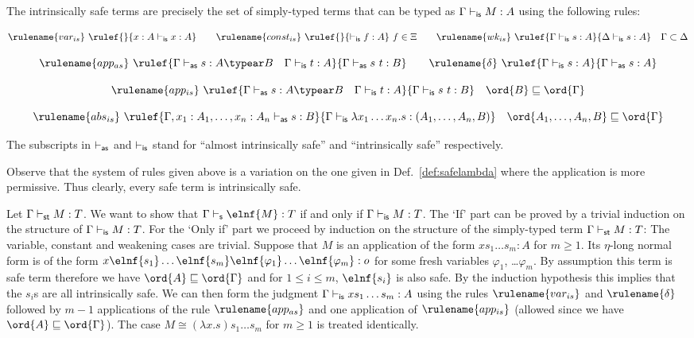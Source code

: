 \begin{lemma}
  \label{lem:intrinsic_safe}
  The intrinsically safe terms are precisely the set of simply-typed terms that can be typed
  as $\Gamma \vdash_{\sf is} M : A$ using the following rules:

$$ \rulename{var_{is}} \ \rulef{}{x : A\isentail x : A} \qquad
\rulename{const_{is}} \ \rulef{}{\isentail f : A}~f \in \Xi \qquad
\rulename{wk_{is}} \ \rulef{\Gamma \isentail s : A}{\Delta \isentail s : A} \quad
\Gamma \subset \Delta$$

$$ \rulename{app_{as}} \ \rulef{\Gamma \asentail s : A\typear B
\quad \Gamma \isentail t : A} {\Gamma \asentail s~t : B}
\qquad
\rulename{\delta} \ \rulef{\Gamma \isentail s : A}{\Gamma \asentail s : A}
$$

$$ \rulename{app_{is}} \ \rulef{\Gamma \asentail s : A\typear B
\quad \Gamma \isentail t : A} {\Gamma \isentail s~t : B} \quad \ord{B} \sqsubseteq
\ord{\Gamma}$$

$$ \rulename{abs_{is}} \ \rulef{\Gamma, x_1 : A_1, \ldots, x_n : A_n
  \asentail s : B} {\Gamma \isentail \lambda x_1 \ldots x_n . s :
  (A_1, \ldots ,A_n,B)} \quad \ord{A_1, \ldots ,A_n,B} \sqsubseteq
\ord{\Gamma}$$
\smallskip

The subscripts in $\vdash_{\sf as}$ and $\vdash_{\sf is}$ stand for ``almost intrinsically safe''
and ``intrinsically safe'' respectively.
\end{lemma}
Observe that the system of rules given above is a variation on the one given in Def.~\ref{def:safelambda} where the application is more permissive. Thus clearly, every safe term is intrinsically safe.

\proof
Let $\Gamma \vdash_{\sf st} M : T$. We want to show that 
$\Gamma \sentail \elnf{M} : T$ if and only if 
$\Gamma \vdash_{\sf is} M : T$.
The `If' part can be proved by a trivial induction on the structure of $\Gamma \vdash_{\sf is} M : T$.
For the `Only if' part we proceed by induction on the structure of the simply-typed term $\Gamma \vdash_{\sf st} M : T$: The variable, constant and weakening cases are trivial. Suppose that $M$ is an application of the form 
$x s_1 \ldots s_m : A$ for $m\geq 1$. Its $\eta$-long normal form is
of the form $x \elnf{s_1} \ldots \elnf{s_m} \elnf{\varphi_1} \ldots \elnf{\varphi_m}: o$ for some fresh variables $\varphi_1$, \ldots $\varphi_m$.
By assumption this term is safe term therefore we have $\ord{A}\sqsubseteq\ord{\Gamma}$ and for $1\leq i \leq m$, $\elnf{s_i}$ is also safe. By the induction hypothesis this implies that
the $s_i$s are all intrinsically safe. We can then form the judgment 
$\Gamma \vdash_{\sf is} x s_1 \ldots s_m : A$ using the
rules $\rulename{var_{is}}$ and $\rulename{\delta}$ followed by $m-1$ applications of the rule $\rulename{app_{as}}$ and one application of
$\rulename{app_{is}}$ (allowed since we have $\ord{A}\sqsubseteq\ord{\Gamma}$).
The case $M\cong (\lambda x. s) s_1 \ldots s_m$ for $m\geq 1$ is treated identically.

